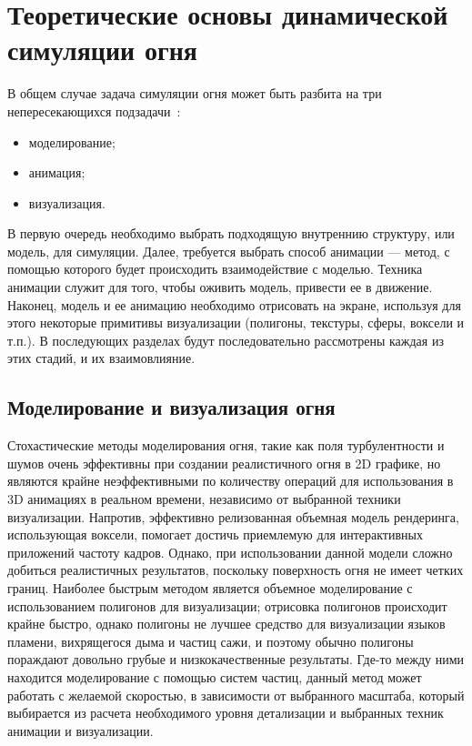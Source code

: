 \chapter{Теоретические основы динамической симуляции огня}

В общем случае задача симуляции огня может быть разбита на три
непересекающихся подзадачи~\cite{Perry94synthesizingflames}:
\begin{itemize}
	\item моделирование;
	\item анимация;
	\item визуализация.
\end{itemize}

В первую очередь необходимо выбрать подходящую внутреннию структуру, или модель,
для симуляции. Далее, требуется выбрать способ анимации --- метод, с помощью
которого будет происходить взаимодействие с моделью. Техника анимации служит для
того, чтобы оживить модель, привести ее в движение. Наконец, модель и ее
анимацию необходимо отрисовать на экране, используя для этого некоторые
примитивы визуализации (полигоны, текстуры, сферы, воксели и т.п.). В
последующих разделах будут последовательно рассмотрены каждая из этих стадий, и
их взаимовлияние.

\section{Моделирование и визуализация огня}

Стохастические методы моделирования огня, такие как поля турбулентности и шумов
очень эффективны при создании реалистичного огня в 2D графике, но являются
крайне неэффективными по количеству операций для использования в 3D анимациях в
реальном времени, независимо от выбранной техники визуализации. Напротив,
эффективно релизованная объемная модель рендеринга, использующая воксели,
помогает достичь приемлемую для интерактивных приложений частоту кадров. Однако,
при использовании данной модели сложно добиться реалистичных результатов,
поскольку поверхность огня не имеет четких границ. Наиболее быстрым методом
является объемное моделирование с использованием полигонов для визуализации;
отрисовка полигонов происходит крайне быстро, однако полигоны не лучшее средство
для визуализации языков пламени, вихрящегося дыма и частиц сажи, и поэтому
обычно полигоны пораждают довольно грубые и низкокачественные результаты. Где-то
между ними находится моделирование с помощью систем частиц, данный метод может
работать с желаемой скоростью, в зависимости от выбранного масштаба, который
выбирается из расчета необходимого уровня детализации и выбранных техник
анимации и визуализации.

